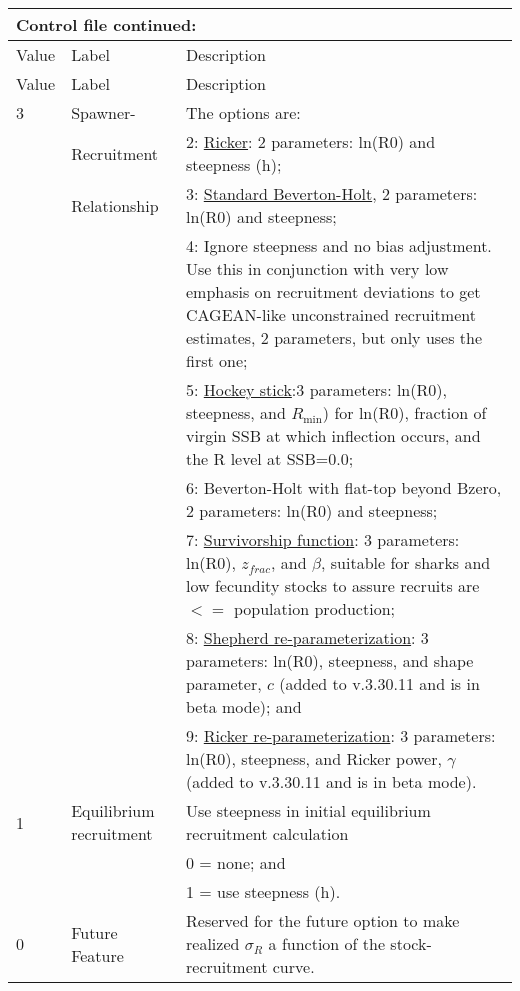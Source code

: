 \begin{longtable}{p{1cm} p{3cm} p{11cm}}
	\multicolumn{3}{l}{Control file continued:} \\
	\hline
	Value & Label & Description \Tstrut\Bstrut\\
	\hline
	\endfirsthead

	\hline
	Value & Label & Description \Tstrut\Bstrut\\
	\hline
	\endhead
	\hline
	\endfoot
	\endlastfoot

	3 & Spawner-            & The options are: \Tstrut\\
	  & Recruitment         & 2: \hyperlink{Ricker}{Ricker}: 2 parameters: ln(R0) and steepness (h); \\
	  & Relationship        & 3: \hyperlink{BH}{Standard Beverton-Holt}, 2 parameters: ln(R0) and steepness; \\
	  &                     & 4: Ignore steepness and no bias adjustment. Use this in conjunction with very low emphasis on recruitment deviations to get CAGEAN-like unconstrained recruitment estimates, 2 parameters, but only uses the first one; \\
	  &                     & 5: \hyperlink{Hockey}{Hockey stick}:3 parameters: ln(R0), steepness, and $R_{\text{min}}$) for ln(R0), fraction of virgin SSB at which inflection occurs, and the R level at SSB=0.0; \\
	  &                     & 6: Beverton-Holt with flat-top beyond Bzero, 2 parameters: ln(R0) and steepness; \\
	  &                     & 7: \hyperlink{Survivorship}{Survivorship function}: 3 parameters: ln(R0), $z_{frac}$, and $\beta$, suitable for sharks and low fecundity stocks to assure recruits are $<=$ population production; \\
	  & 					& 8: \hyperlink{Shepherd}{Shepherd re-parameterization}: 3 parameters: ln(R0), steepness, and shape parameter, $c$ (added to v.3.30.11 and is in beta mode); and \\
	  & 					& 9: \hyperlink{Ricker2}{Ricker re-parameterization}: 3 parameters: ln(R0), steepness, and Ricker power, $\gamma$ (added to v.3.30.11 and is in beta mode). \Bstrut\\
	\hline

	1 \Tstrut & Equilibrium recruitment & Use steepness in initial equilibrium recruitment calculation \\
	  & 						& 0 = none; and \\
	  &							& 1 = use steepness (h). \\
	0 & Future Feature			& Reserved for the future option to make realized $\sigma_R$ a function of the stock-recruitment curve. \Bstrut\\ 
	\hline
\end{longtable}

